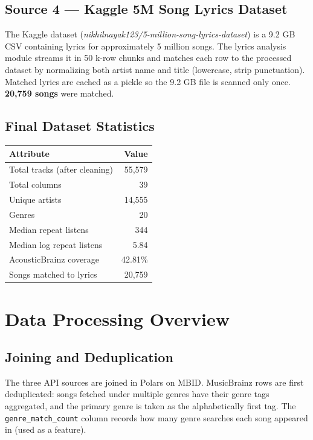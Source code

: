 \documentclass[11pt, letterpaper]{article}
\begin{document}
\subsection{Source 4 — Kaggle 5M Song Lyrics Dataset}

The Kaggle dataset (\textit{nikhilnayak123/5-million-song-lyrics-dataset})
is a 9.2 GB CSV containing lyrics for approximately 5 million songs.
The lyrics analysis module streams it in 50 k-row chunks and matches each row
to the processed dataset by normalizing both artist name and title
(lowercase, strip punctuation). Matched lyrics are cached as a pickle so
the 9.2 GB file is scanned only once. \textbf{20,759 songs} were matched.

\subsection{Final Dataset Statistics}

\begin{center}
\begin{tabular}{lr}
\toprule
\textbf{Attribute} & \textbf{Value} \\
\midrule
Total tracks (after cleaning) & 55,579 \\
Total columns & 39 \\
Unique artists & 14,555 \\
Genres & 20 \\
Median repeat listens & 344 \\
Median log repeat listens & 5.84 \\
AcousticBrainz coverage & 42.81\% \\
Songs matched to lyrics & 20,759 \\
\bottomrule
\end{tabular}
\end{center}

\section{Data Processing Overview}

\subsection{Joining and Deduplication}

The three API sources are joined in Polars on MBID. MusicBrainz rows are
first deduplicated: songs fetched under multiple genres have their genre tags
aggregated, and the primary genre is taken as the alphabetically first tag.
The \texttt{genre\_match\_count} column records how many genre searches each
song appeared in (used as a feature).
\end{document}
